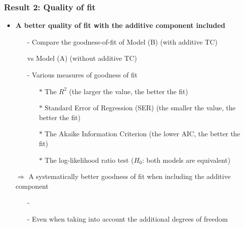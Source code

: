 \documentclass[10 pt,Helvetica, french]{beamer}
\begin{document}
\begin{frame}[label=slide_goodnessfit]
\frametitle{Result 2: Quality of fit}
\begin{itemize}
\item \textbf{ A better quality of fit with the additive component included} \vspace{0.2cm}
\begin{itemize}
\item[-] Compare the goodness-of-fit of Model (B) (with additive TC)  \vspace{0.1cm}
\item[ ] vs Model (A) (without additive TC) \vspace{0.1cm}
\item[-] Various measures of goodness of fit \vspace{0.1cm}
\begin{itemize}
\item[$\ast$] The $R^2$ (the larger the value, the better the fit) \vspace{0.1cm}
\item[$\ast$] Standard Error of Regression (SER) (the smaller the value, the better the fit) \vspace{0.1cm}
\item[$\ast$] The Akaike Information Criterion (the lower AIC, the better the fit) \vspace{0.1cm}
\item[$\ast$] The log-likelihood ratio test ($H_0$: both models are equivalent) \vspace{0.1cm}
\end{itemize}
\end{itemize}
\item[$\Rightarrow$] A systematically better goodness of fit when including the additive component  \vspace{0.1cm}

\begin{itemize}
\item[-] \hyperlink{app_goodnessfit}{} \vspace{0.1cm}
\item[-] Even when taking into account the additional degrees of freedom
\end{itemize}
\end{itemize}
\end{frame}
\end{document}
